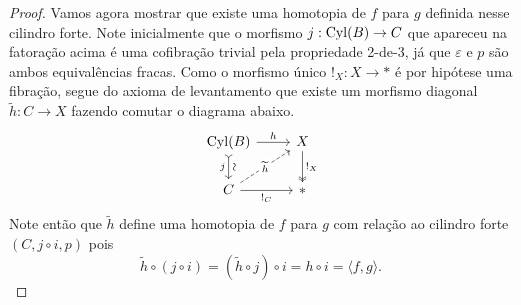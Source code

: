 \begin{proof}
  Vamos agora mostrar que existe uma homotopia de $f$ para $g$ definida nesse cilindro forte.
  Note inicialmente que o morfismo $j: \mathrm{Cyl}(B) \to C$ que apareceu na fatoração acima é uma cofibração trivial pela propriedade 2-de-3, já que $\varepsilon$ e $p$ são ambos equivalências fracas.
  Como o morfismo único $!_{X}: X \to *$ é por hipótese uma fibração, segue do axioma de levantamento que existe um morfismo diagonal $\widetilde{h}: C \to X$ fazendo comutar o diagrama abaixo.
  \begin{displaymath}
    \begin{tikzcd}
      \Cyl(B)
      \arrow[r, "h"]
      \arrow[d, tail, "j" {swap}, "\sim" {sloped}]
      & X
      \arrow[d, two heads, "!_{X}"]
      \\ C
      \arrow[r, "!_{C}" swap]
      \arrow[ru, dashed, "\widetilde{h}" description]
      & *
    \end{tikzcd}
  \end{displaymath}
  Note então que $\widetilde{h}$ define uma homotopia de $f$ para $g$ com relação ao cilindro forte $(C,j \circ i,p)$ pois
  \begin{displaymath}
    \widetilde{h} \circ (j \circ i)
    = (\widetilde{h} \circ j) \circ i
    = h \circ i
    = \langle f,g \rangle.
  \end{displaymath}


\end{proof}
